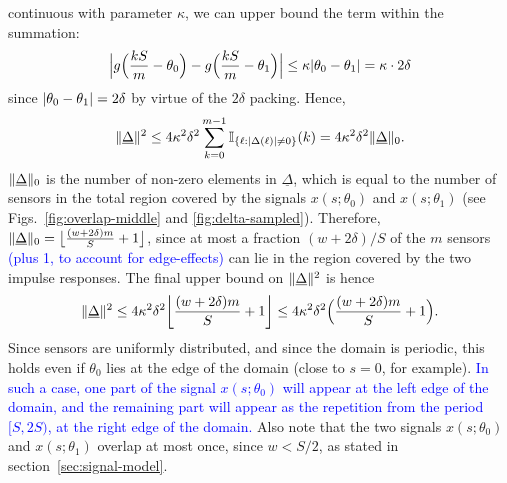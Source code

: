 \documentclass[conference]{IEEEtran}
\providecommand{\v}{}
\renewcommand{\v}[1]{\underline{#1}}
\DeclarePairedDelimiter\abs{\lvert}{\rvert}
\DeclarePairedDelimiter\norm{\lVert}{\rVert}
\DeclarePairedDelimiter\floor{\lfloor}{\rfloor}
\begin{document}
\begin{IEEEproof}
continuous with parameter $\kappa$, we can upper bound the term within the
summation:
\begin{equation}
	\abs[\Big]{g\Big(\frac{kS}{m} - \theta_0\Big) - g\Big(\frac{kS}{m} - \theta_1\Big)} \leq \kappa \abs{\theta_0 - \theta_1} = \kappa \cdot 2\delta
\end{equation}
since $\abs{\theta_0 - \theta_1} = 2\delta$ by virtue of the $2\delta$ packing.
Hence,
\begin{equation}
	\norm{\v\Delta}^2 \leq 4 \kappa^2 \delta^2 \sum_{k=0}^{m-1} \mathbb I_{\{\ell: \abs{\Delta(\ell)} \neq 0\}}(k) = 4 \kappa^2 \delta^2 \norm{\v\Delta}_0.
\end{equation}
$\norm{\v\Delta}_0$ is the number of non-zero elements in $\v\Delta$, which is
equal to the number of sensors in the total region covered by the signals
$x(s;\theta_0)$ and $x(s;\theta_1)$ (see Figs.~\ref{fig:overlap-middle} and
\ref{fig:delta-sampled}). Therefore, $\norm{\v\Delta}_0 = \floor[\big]{\frac{(w
+ 2\delta)m}{S} + 1}$, since at most a fraction $(w + 2\delta) / S$ of the $m$
sensors \textcolor{blue}{(plus 1, to account for edge-effects)} can lie in the region covered by
the two impulse responses. The final upper bound on $\norm{\v\Delta}^2$ is
hence
\begin{equation} \label{eq:delta-bound}
	\norm{\v\Delta}^2 \leq 4 \kappa^2 \delta^2 \floor*{\frac{(w + 2\delta)m}{S} + 1} \leq 4 \kappa^2 \delta^2 \Big(\frac{(w + 2\delta) m}{S} + 1\Big).
\end{equation}
Since sensors are uniformly distributed, and since the domain is periodic, this
holds even if $\theta_0$ lies at the edge of the domain (close to $s=0$, for
example). \textcolor{blue}{In such a case, one part of the signal $x(s;\theta_0)$ will appear at
the left edge of the domain, and the remaining part will appear as the
repetition from the period $[S, 2S)$, at the right edge of the domain.} Also
note that the two signals $x(s;\theta_0)$ and $x(s;\theta_1)$ overlap at most
once, since $w < S/2$, as stated in section~\ref{sec:signal-model}.


\end{IEEEproof}
\end{document}
